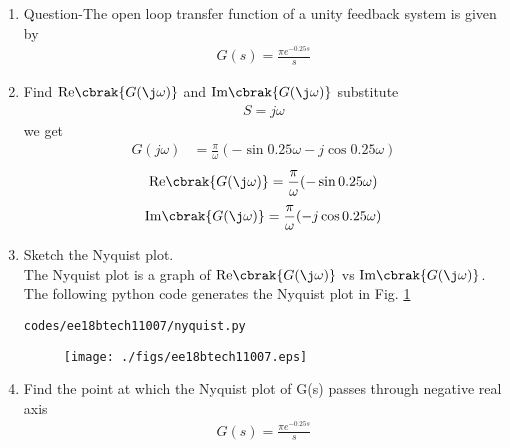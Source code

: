 \begin{enumerate}[label=\thesection.\arabic*.,ref=\thesection.\theenumi]

\item Question-The open loop transfer function of a unity feedback system is given by
\begin{align*}
 G(s)=\frac{\pi e^{-0.25s}}{s}
\end{align*}
\item Find  $\text{Re} \cbrak{G(\j \omega)}$ and  $\text{Im} \cbrak{G(\j \omega)}$
\newline
\solution 
substitute \begin{align}
S=j\omega
\end{align}
we get \begin{align}
G(j\omega)&=\frac{\pi}{\omega}(-\sin{0.25\omega}-j\cos{0.25\omega})
\end{align}
\begin{align}
 \text{Re} \cbrak{G(\j \omega)}=\frac{\pi}{\omega}(-\sin{0.25\omega}) 
\end{align}
\begin{align}
 \text{Im} \cbrak{G(\j \omega)}=\frac{\pi}{\omega}(-j\cos{0.25\omega}) 
\end{align}
\item Sketch the Nyquist plot.
\\
\solution The Nyquist plot is a graph of $\text{Re} \cbrak{G(\j \omega)}$  vs $\text{Im} \cbrak{G(\j \omega)}$.
The following python code generates the Nyquist plot in Fig.  \ref{fig:ee18btech11007}
\begin{lstlisting}
codes/ee18btech11007/nyquist.py
\end{lstlisting}
%
\begin{figure}[!h]
  \texttt{[image: ./figs/ee18btech11007.eps]}
  \caption{}
  \label{fig:ee18btech11007}
\end{figure}
%
\item Find the point at which the Nyquist plot of G(s) passes through negative real axis
\newline
\solution
\begin{align}
G(s)=\frac{\pi e^{-0.25s}}{s}
\end{align}


\end{enumerate}
